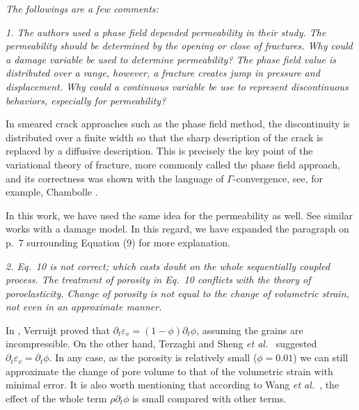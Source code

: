 \documentclass{elsarticle}
\newcommand{\review}[1]{ \textit{#1}}
\begin{document}
{{    \review{The followings are a few comments:}
    	
    	\review{1. The authors used a phase field depended permeability in their study. The permeability should be determined by the opening or close of fractures. Why could a damage variable be used to determine permeability? The phase field value is distributed over a range, however, a fracture creates jump in pressure and displacement. Why could a continuous variable be use to represent discontinuous behaviors, especially for permeability?}

{In smeared crack approaches such as the phase field method, the discontinuity is distributed over a finite width so that the sharp description of the crack is replaced by a diffusive description. This is precisely the key point of the variational theory of fracture, more commonly called the phase field approach, and its correctness was shown with the language of $\Gamma$-convergence, see, for example, Chambolle \cite{CHAMBOLLE2004929}.}
	
{In this work, we have used the same idea for the permeability as well. See similar works \cite{PILLAI201836, ZHU2013179} with a damage model. In this regard, we have expanded the paragraph on p.~7 surrounding Equation (9) for more explanation. %
}

\bigskip

    \review{2. Eq.~10 is not correct; which casts doubt on the whole sequentially coupled process. The treatment of porosity in Eq.~10 conflicts with the theory of poroelasticity. Change of porosity is not equal to the change of volumetric strain, not even in an approximate manner.}

{In \cite{verruijt2013theory}, Verruijt proved that $\partial_t\varepsilon_v=(1-\phi)\partial_t\phi$, assuming the grains are incompressible. On the other hand, Terzaghi \cite{terzaghi1943} and Sheng \emph{et al.}~\cite{sheng2012extended} suggested $\partial_t\varepsilon_v=\partial_t\phi$. In any case, as the porosity is relatively small ($\phi=0.01$) we can still approximate the change of pore volume to that of the volumetric strain with minimal error. It is also worth mentioning that according to Wang \emph{et al.}~\cite{wang2018influence}, the effect of the whole term $\rho\partial_t\phi$ is small compared with other terms.}

}}
\end{document}
